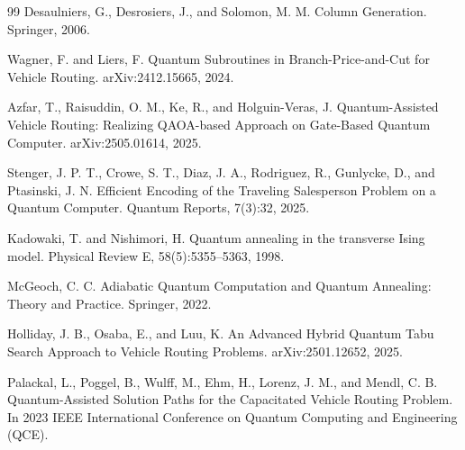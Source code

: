 \begin{thebibliography}{99}
Desaulniers, G., Desrosiers, J., and Solomon, M. M.
Column Generation.
Springer, 2006.

Wagner, F. and Liers, F.
Quantum Subroutines in Branch-Price-and-Cut for Vehicle Routing.
arXiv:2412.15665, 2024.

Azfar, T., Raisuddin, O. M., Ke, R., and Holguin-Veras, J.
Quantum-Assisted Vehicle Routing: Realizing QAOA-based Approach on Gate-Based Quantum Computer.
arXiv:2505.01614, 2025.

Stenger, J. P. T., Crowe, S. T., Diaz, J. A., Rodriguez, R., Gunlycke, D., and Ptasinski, J. N.
Efficient Encoding of the Traveling Salesperson Problem on a Quantum Computer.
Quantum Reports, 7(3):32, 2025.

Kadowaki, T. and Nishimori, H.
Quantum annealing in the transverse Ising model.
Physical Review E, 58(5):5355–5363, 1998.

McGeoch, C. C.
Adiabatic Quantum Computation and Quantum Annealing: Theory and Practice.
Springer, 2022.

Holliday, J. B., Osaba, E., and Luu, K.
An Advanced Hybrid Quantum Tabu Search Approach to Vehicle Routing Problems.
arXiv:2501.12652, 2025.

Palackal, L., Poggel, B., Wulff, M., Ehm, H., Lorenz, J. M., and Mendl, C. B.
Quantum-Assisted Solution Paths for the Capacitated Vehicle Routing Problem.
In 2023 IEEE International Conference on Quantum Computing and Engineering (QCE).

\end{thebibliography}